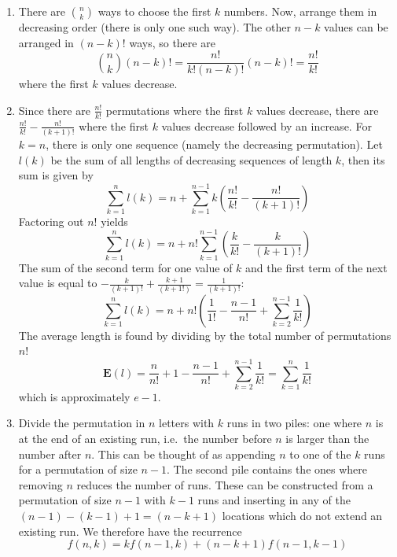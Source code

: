 \begin{solution}
    \begin{enumerate}[label=(\alph*)]
        \item There are $\binom{n}{k}$ ways to choose the first $k$ numbers. Now, arrange them in decreasing order (there is only one such way). The other $n-k$ values can be arranged in $(n-k)!$ ways, so there are 
        \[
            \binom{n}{k}(n-k)! = \frac{n!}{k!(n-k)!}(n-k)! = \frac{n!}{k!}
        \]
        where the first $k$ values decrease.
        \item Since there are $\frac{n!}{k!}$ permutations where the first $k$ values decrease, there are $\frac{n!}{k!} - \frac{n!}{(k+1)!}$ where the first $k$ values decrease followed by an increase. For $k=n$, there is only one sequence (namely the decreasing permutation). Let $l(k)$ be the sum of all lengths of decreasing sequences of length $k$, then its sum is given by
        \[
            \sum_{k=1}^n l(k) = n + \sum_{k=1}^{n-1} k\left(\frac{n!}{k!} - \frac{n!}{(k+1)!}\right) 
        \]
        Factoring out $n!$ yields
        \[
            \sum_{k=1}^n l(k) = n + n! \sum_{k=1}^{n-1} \left(\frac{k}{k!} - \frac{k}{(k+1)!}\right)
        \]
        The sum of the second term for one value of $k$ and the first term of the next value is equal to $- \frac{k}{(k+1)!} + \frac{k+1}{(k+1!)} = \frac{1}{(k+1)!}$:
        \[
            \sum_{k=1}^n l(k) = n + n!\left(\frac{1}{1!}-\frac{n-1}{n!} + \sum_{k=2}^{n-1} \frac{1}{k!}\right)
        \]
        The average length is found by dividing by the total number of permutations $n!$
        \[
            \mathbf{E}(l) = \frac{n}{n!} + 1 - \frac{n-1}{n!} + \sum_{k=2}^{n-1} \frac{1}{k!} = \sum_{k=1}^{n} \frac{1}{k!}
        \]
        which is approximately $e-1$.
        \item Divide the permutation in $n$ letters with $k$ runs in two piles: one where $n$ is at the end of an existing run, i.e.\ the number before $n$ is larger than the number after $n$. This can be thought of as appending $n$ to one of the $k$ runs for a permutation of size $n-1$. The second pile contains the ones where removing $n$ reduces the number of runs. These can be constructed from a permutation of size $n-1$ with $k-1$ runs and inserting in any of the $(n-1) - (k-1) + 1 = (n-k+1)$ locations which do not extend an existing run. We therefore have the recurrence
        \[
            f(n,k) = kf(n-1,k) + (n-k+1)f(n-1,k-1)
        \]
    \end{enumerate}
\end{solution}

